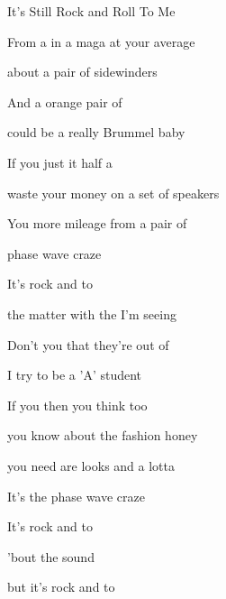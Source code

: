 \begin{SBSong}{It's Still Rock and Roll To Me}
\begin{SBVerse}
	From a  in a maga  at your average  
	
	 about a pair of  sidewinders 
	
	And a  orange pair of 
	
	 could be a really  Brummel baby 
	
	If you just  it half a 
	
	 waste your money on a  set of speakers 
	
	You  more mileage from a  pair of 
	
	 phase  wave  craze 
	
	It's  rock and  to 
  \end{SBVerse}
  \begin{SBVerse}
	 the matter with the  I'm seeing 
	
	Don't you  that they're out of 
	
	 I try to be a  'A' student 
	
	If you  then you think too  
	
	 you know about the  fashion honey 
	
	 you need are looks and a  lotta  
	
	It's the  phase  wave  craze  
	
	It's  rock and  to  
	
	  'bout the  sound 
	
	 but it's  rock and  to 
  \end{SBVerse}
 \end{SBSong}